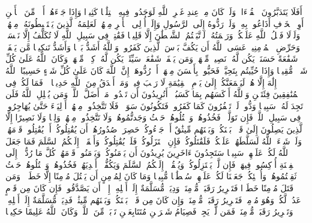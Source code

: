 \stopbuffer%
\startbuffer[\q:4:82]
أَفَلَا یَتَدَبَّرُونَ ٱلۡقُرۡءَانَۚ وَلَوۡ كَانَ مِنۡ عِندِ غَیۡرِ ٱللَّهِ لَوَجَدُوا۟ فِیهِ ٱخۡتِلَٰفࣰا كَثِیرࣰا%
\stopbuffer%
\startbuffer[\q:4:83]
وَإِذَا جَاۤءَهُمۡ أَمۡرࣱ مِّنَ ٱلۡأَمۡنِ أَوِ ٱلۡخَوۡفِ أَذَاعُوا۟ بِهِۦۖ وَلَوۡ رَدُّوهُ إِلَى ٱلرَّسُولِ وَإِلَىٰۤ أُو۟لِی ٱلۡأَمۡرِ مِنۡهُمۡ لَعَلِمَهُ ٱلَّذِینَ یَسۡتَنۢبِطُونَهُۥ مِنۡهُمۡۗ وَلَوۡلَا فَضۡلُ ٱللَّهِ عَلَیۡكُمۡ وَرَحۡمَتُهُۥ لَٱتَّبَعۡتُمُ ٱلشَّیۡطَٰنَ إِلَّا قَلِیلࣰا%
\stopbuffer%
\startbuffer[\q:4:84]
فَقَٰتِلۡ فِی سَبِیلِ ٱللَّهِ لَا تُكَلَّفُ إِلَّا نَفۡسَكَۚ وَحَرِّضِ ٱلۡمُؤۡمِنِینَۖ عَسَى ٱللَّهُ أَن یَكُفَّ بَأۡسَ ٱلَّذِینَ كَفَرُوا۟ۚ وَٱللَّهُ أَشَدُّ بَأۡسࣰا وَأَشَدُّ تَنكِیلࣰا%
\stopbuffer%
\startbuffer[\q:4:85]
مَّن یَشۡفَعۡ شَفَٰعَةً حَسَنَةࣰ یَكُن لَّهُۥ نَصِیبࣱ مِّنۡهَاۖ وَمَن یَشۡفَعۡ شَفَٰعَةࣰ سَیِّئَةࣰ یَكُن لَّهُۥ كِفۡلࣱ مِّنۡهَاۗ وَكَانَ ٱللَّهُ عَلَىٰ كُلِّ شَیۡءࣲ مُّقِیتࣰا%
\stopbuffer%
\startbuffer[\q:4:86]
وَإِذَا حُیِّیتُم بِتَحِیَّةࣲ فَحَیُّوا۟ بِأَحۡسَنَ مِنۡهَاۤ أَوۡ رُدُّوهَاۤۗ إِنَّ ٱللَّهَ كَانَ عَلَىٰ كُلِّ شَیۡءٍ حَسِیبًا%
\stopbuffer%
\startbuffer[\q:4:87]
ٱللَّهُ لَاۤ إِلَٰهَ إِلَّا هُوَۚ لَیَجۡمَعَنَّكُمۡ إِلَىٰ یَوۡمِ ٱلۡقِیَٰمَةِ لَا رَیۡبَ فِیهِۗ وَمَنۡ أَصۡدَقُ مِنَ ٱللَّهِ حَدِیثࣰا%
\stopbuffer%
\startbuffer[\q:4:88]
۞ فَمَا لَكُمۡ فِی ٱلۡمُنَٰفِقِینَ فِئَتَیۡنِ وَٱللَّهُ أَرۡكَسَهُم بِمَا كَسَبُوۤا۟ۚ أَتُرِیدُونَ أَن تَهۡدُوا۟ مَنۡ أَضَلَّ ٱللَّهُۖ وَمَن یُضۡلِلِ ٱللَّهُ فَلَن تَجِدَ لَهُۥ سَبِیلࣰا%
\stopbuffer%
\startbuffer[\q:4:89]
وَدُّوا۟ لَوۡ تَكۡفُرُونَ كَمَا كَفَرُوا۟ فَتَكُونُونَ سَوَاۤءࣰۖ فَلَا تَتَّخِذُوا۟ مِنۡهُمۡ أَوۡلِیَاۤءَ حَتَّىٰ یُهَاجِرُوا۟ فِی سَبِیلِ ٱللَّهِۚ فَإِن تَوَلَّوۡا۟ فَخُذُوهُمۡ وَٱقۡتُلُوهُمۡ حَیۡثُ وَجَدتُّمُوهُمۡۖ وَلَا تَتَّخِذُوا۟ مِنۡهُمۡ وَلِیࣰّا وَلَا نَصِیرًا%
\stopbuffer%
\startbuffer[\q:4:90]
إِلَّا ٱلَّذِینَ یَصِلُونَ إِلَىٰ قَوۡمِۭ بَیۡنَكُمۡ وَبَیۡنَهُم مِّیثَٰقٌ أَوۡ جَاۤءُوكُمۡ حَصِرَتۡ صُدُورُهُمۡ أَن یُقَٰتِلُوكُمۡ أَوۡ یُقَٰتِلُوا۟ قَوۡمَهُمۡۚ وَلَوۡ شَاۤءَ ٱللَّهُ لَسَلَّطَهُمۡ عَلَیۡكُمۡ فَلَقَٰتَلُوكُمۡۚ فَإِنِ ٱعۡتَزَلُوكُمۡ فَلَمۡ یُقَٰتِلُوكُمۡ وَأَلۡقَوۡا۟ إِلَیۡكُمُ ٱلسَّلَمَ فَمَا جَعَلَ ٱللَّهُ لَكُمۡ عَلَیۡهِمۡ سَبِیلࣰا%
\stopbuffer%
\startbuffer[\q:4:91]
سَتَجِدُونَ ءَاخَرِینَ یُرِیدُونَ أَن یَأۡمَنُوكُمۡ وَیَأۡمَنُوا۟ قَوۡمَهُمۡ كُلَّ مَا رُدُّوۤا۟ إِلَى ٱلۡفِتۡنَةِ أُرۡكِسُوا۟ فِیهَاۚ فَإِن لَّمۡ یَعۡتَزِلُوكُمۡ وَیُلۡقُوۤا۟ إِلَیۡكُمُ ٱلسَّلَمَ وَیَكُفُّوۤا۟ أَیۡدِیَهُمۡ فَخُذُوهُمۡ وَٱقۡتُلُوهُمۡ حَیۡثُ ثَقِفۡتُمُوهُمۡۚ وَأُو۟لَٰۤئِكُمۡ جَعَلۡنَا لَكُمۡ عَلَیۡهِمۡ سُلۡطَٰنࣰا مُّبِینࣰا%
\stopbuffer%
\startbuffer[\q:4:92]
وَمَا كَانَ لِمُؤۡمِنٍ أَن یَقۡتُلَ مُؤۡمِنًا إِلَّا خَطَءࣰاۚ وَمَن قَتَلَ مُؤۡمِنًا خَطَءࣰا فَتَحۡرِیرُ رَقَبَةࣲ مُّؤۡمِنَةࣲ وَدِیَةࣱ مُّسَلَّمَةٌ إِلَىٰۤ أَهۡلِهِۦۤ إِلَّاۤ أَن یَصَّدَّقُوا۟ۚ فَإِن كَانَ مِن قَوۡمٍ عَدُوࣲّ لَّكُمۡ وَهُوَ مُؤۡمِنࣱ فَتَحۡرِیرُ رَقَبَةࣲ مُّؤۡمِنَةࣲۖ وَإِن كَانَ مِن قَوۡمِۭ بَیۡنَكُمۡ وَبَیۡنَهُم مِّیثَٰقࣱ فَدِیَةࣱ مُّسَلَّمَةٌ إِلَىٰۤ أَهۡلِهِۦ وَتَحۡرِیرُ رَقَبَةࣲ مُّؤۡمِنَةࣲۖ فَمَن لَّمۡ یَجِدۡ فَصِیَامُ شَهۡرَیۡنِ مُتَتَابِعَیۡنِ تَوۡبَةࣰ مِّنَ ٱللَّهِۗ وَكَانَ ٱللَّهُ عَلِیمًا حَكِیمࣰا%
